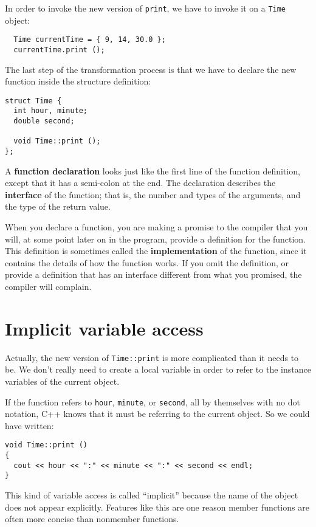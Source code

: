 In order to invoke the new version of {\tt print}, we have
to invoke it on a {\tt Time} object:

\begin{verbatim}
  Time currentTime = { 9, 14, 30.0 };
  currentTime.print ();
\end{verbatim}
%
The last step of the transformation process is that we have to
declare the new function inside the structure definition:

\begin{verbatim}
struct Time {
  int hour, minute;
  double second;

  void Time::print ();
};
\end{verbatim}
%
A {\bf function declaration} looks just like the first line of the
function definition, except that it has a semi-colon at the end.  The
declaration describes the {\bf interface} of the function; that is,
the number and types of the arguments, and the type of the return
value.

When you declare a function, you are making a promise to the compiler
that you will, at some point later on in the program, provide a
definition for the function.  This definition is sometimes called
the {\bf implementation} of the function, since it contains the
details of how the function works.  If you omit the definition, or
provide a definition that has an interface different from what
you promised, the compiler will complain.

\section {Implicit variable access}

Actually, the new version of {\tt Time::print} is more complicated
than it needs to be.  We don't really need to create a local
variable in order to refer to the instance variables of the current
object.

If the function refers to {\tt hour}, {\tt minute}, or {\tt second},
all by themselves with no dot notation, C++ knows that it must
be referring to the current object.  So we could have written:

\begin{verbatim}
void Time::print ()
{
  cout << hour << ":" << minute << ":" << second << endl;
}
\end{verbatim}
%
This kind of variable access is called ``implicit'' because the
name of the object does not appear explicitly.  Features like
this are one reason member functions are often more concise
than nonmember functions.

